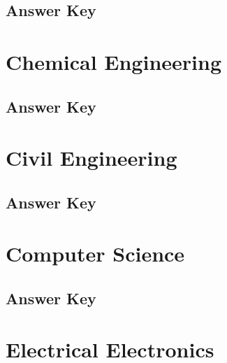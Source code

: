 \documentclass[12pt,a4paper]{book}
\newcounter{totalcounter}
\begin{document}


\subsection*{Answer Key}



\setcounter{totalcounter}{1}

\section{Chemical Engineering}



\subsection*{Answer Key}



\setcounter{totalcounter}{1}

\section{Civil Engineering}



\subsection*{Answer Key}



\setcounter{totalcounter}{1}

\section{Computer Science}



\subsection*{Answer Key}



\setcounter{totalcounter}{1}

\section{Electrical Electronics}
\end{document}
